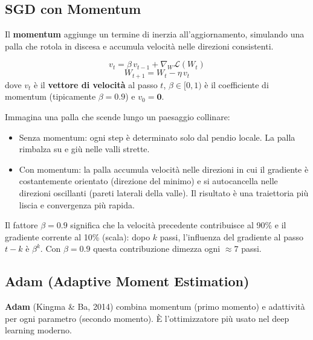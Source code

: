 \documentclass[
  11pt,
]{article}
\begin{document}
\subsection{SGD con Momentum}

Il \textbf{momentum} aggiunge un termine di inerzia all'aggiornamento, simulando una palla che rotola in discesa e accumula velocità nelle direzioni consistenti.

\begin{formulabox}[title={\textbf{SGD con Momentum}}]
\[
v_t = \beta\, v_{t-1} + \nabla_W \mathcal{L}(W_t)
\]
\[
W_{t+1} = W_t - \eta\, v_t
\]
dove $v_t$ è il \textbf{vettore di velocità} al passo $t$, $\beta \in [0,1)$ è il coefficiente di momentum (tipicamente $\beta = 0.9$) e $v_0 = \mathbf{0}$.
\end{formulabox}

\begin{notabox}[title={\textbf{Intuizione: la palla che rotola in discesa}}]
Immagina una palla che scende lungo un paesaggio collinare:
\begin{itemize}
  \item Senza momentum: ogni step è determinato solo dal pendio locale. La palla rimbalza su e giù nelle valli strette.
  \item Con momentum: la palla accumula velocità nelle direzioni in cui il gradiente è costantemente orientato (direzione del minimo) e si autocancella nelle direzioni oscillanti (pareti laterali della valle). Il risultato è una traiettoria più liscia e convergenza più rapida.
\end{itemize}
Il fattore $\beta = 0.9$ significa che la velocità precedente contribuisce al 90\% e il gradiente corrente al 10\% (scala): dopo $k$ passi, l'influenza del gradiente al passo $t-k$ è $\beta^k$. Con $\beta=0.9$ questa contribuzione dimezza ogni $\approx 7$ passi.
\end{notabox}

\subsection{Adam (Adaptive Moment Estimation)}

\textbf{Adam} (Kingma \& Ba, 2014) combina momentum (primo momento) e adattività per ogni parametro (secondo momento). È l'ottimizzatore più usato nel deep learning moderno.
\end{document}
